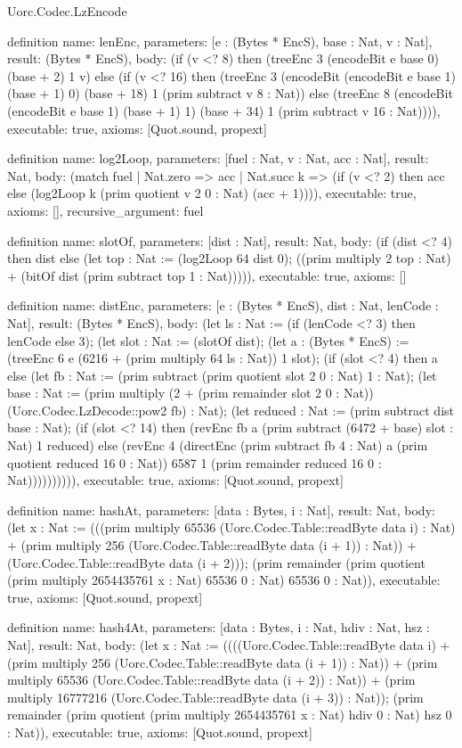 \begin{lexlean}{Uorc.Codec.LzEncode}
\begin{semanticmodule}
definition{
  name: lenEnc,
  parameters: [e : (Bytes * EncS), base : Nat, v : Nat],
  result: (Bytes * EncS),
  body: (if (v <? 8) then (treeEnc 3 (encodeBit e base 0) (base + 2) 1 v) else (if (v <? 16) then (treeEnc 3 (encodeBit (encodeBit e base 1) (base + 1) 0) (base + 18) 1 (prim subtract v 8 : Nat)) else (treeEnc 8 (encodeBit (encodeBit e base 1) (base + 1) 1) (base + 34) 1 (prim subtract v 16 : Nat)))),
  executable: true,
  axioms: [Quot.sound, propext]
}

definition{
  name: log2Loop,
  parameters: [fuel : Nat, v : Nat, acc : Nat],
  result: Nat,
  body: (match fuel
    | Nat.zero => acc
    | Nat.succ k => (if (v <? 2) then acc else (log2Loop k (prim quotient v 2 0 : Nat) (acc + 1)))),
  executable: true,
  axioms: [],
  recursive_argument: fuel
}

definition{
  name: slotOf,
  parameters: [dist : Nat],
  result: Nat,
  body: (if (dist <? 4) then dist else (let top : Nat := (log2Loop 64 dist 0); ((prim multiply 2 top : Nat) + (bitOf dist (prim subtract top 1 : Nat))))),
  executable: true,
  axioms: []
}

definition{
  name: distEnc,
  parameters: [e : (Bytes * EncS), dist : Nat, lenCode : Nat],
  result: (Bytes * EncS),
  body: (let ls : Nat := (if (lenCode <? 3) then lenCode else 3); (let slot : Nat := (slotOf dist); (let a : (Bytes * EncS) := (treeEnc 6 e (6216 + (prim multiply 64 ls : Nat)) 1 slot); (if (slot <? 4) then a else (let fb : Nat := (prim subtract (prim quotient slot 2 0 : Nat) 1 : Nat); (let base : Nat := (prim multiply (2 + (prim remainder slot 2 0 : Nat)) (Uorc.Codec.LzDecode::pow2 fb) : Nat); (let reduced : Nat := (prim subtract dist base : Nat); (if (slot <? 14) then (revEnc fb a (prim subtract (6472 + base) slot : Nat) 1 reduced) else (revEnc 4 (directEnc (prim subtract fb 4 : Nat) a (prim quotient reduced 16 0 : Nat)) 6587 1 (prim remainder reduced 16 0 : Nat)))))))))),
  executable: true,
  axioms: [Quot.sound, propext]
}

definition{
  name: hashAt,
  parameters: [data : Bytes, i : Nat],
  result: Nat,
  body: (let x : Nat := (((prim multiply 65536 (Uorc.Codec.Table::readByte data i) : Nat) + (prim multiply 256 (Uorc.Codec.Table::readByte data (i + 1)) : Nat)) + (Uorc.Codec.Table::readByte data (i + 2))); (prim remainder (prim quotient (prim multiply 2654435761 x : Nat) 65536 0 : Nat) 65536 0 : Nat)),
  executable: true,
  axioms: [Quot.sound, propext]
}

definition{
  name: hash4At,
  parameters: [data : Bytes, i : Nat, hdiv : Nat, hsz : Nat],
  result: Nat,
  body: (let x : Nat := ((((Uorc.Codec.Table::readByte data i) + (prim multiply 256 (Uorc.Codec.Table::readByte data (i + 1)) : Nat)) + (prim multiply 65536 (Uorc.Codec.Table::readByte data (i + 2)) : Nat)) + (prim multiply 16777216 (Uorc.Codec.Table::readByte data (i + 3)) : Nat)); (prim remainder (prim quotient (prim multiply 2654435761 x : Nat) hdiv 0 : Nat) hsz 0 : Nat)),
  executable: true,
  axioms: [Quot.sound, propext]
}


\end{semanticmodule}
\end{lexlean}
